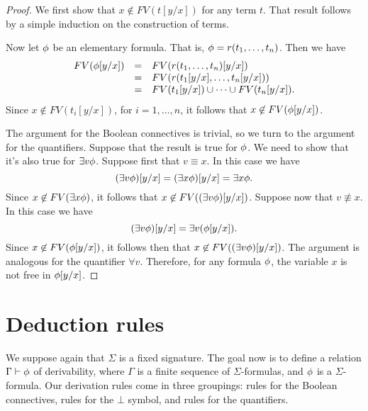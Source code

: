 \begin{proof} We first show that $x\not\in FV(t[y/x])$ for any term
  $t$.  That result follows by a simple induction on the construction
  of terms.

  Now let $\phi$ be an elementary formula.  That is,
  $\phi =r(t_1,\dots ,t_n)$.  Then we have
  \[ \begin{array}{l l l} FV(\phi [y/x]) & = & FV(r(t_1,\dots ,t_n)[y/x]) \\
                                        &=& FV(r(t_1[y/x],\dots ,t_n[y/x])) \\
                                        &=& FV(t_1[y/x])\cup\cdots\cup
                                            FV(t_n[y/x])
                                            .\end{array} \] %
                                        Since $x\not\in FV(t_i[y/x])$,
                                        for $i=1,\dots ,n$, it follows
                                        that $x\not\in FV(\phi [y/x])$.

The argument for the Boolean connectives is trivial, so we turn to the
argument for the quantifiers.  Suppose that the result is true for
$\phi$.  We need to show that it's also true for $\exists v\phi$.
Suppose first that $v\equiv x$.  In this case we have
\[ (\exists v\phi )[y/x] = (\exists x\phi )[y/x] = \exists x\phi .\]
Since $x\not\in FV(\exists x\phi )$, it follows that $x\not\in
FV((\exists v \phi )[y/x])$.  Suppose now that $v\not\equiv x$.  In
this case we have
\[ (\exists v\phi )[y/x] = \exists v(\phi [y/x]) .\] Since
$x\not\in FV(\phi [y/x])$, it follows then that
$x\not\in FV((\exists v\phi )[y/x])$. The argument is analogous for the
quantifier $\forall v$.  Therefore, for any formula $\phi$, the
variable $x$ is not free in $\phi [y/x]$.
\end{proof}











\section{Deduction rules}

We suppose again that $\Sigma$ is a fixed signature.  The goal now is
to define a relation $\Gamma \vdash \phi$ of derivability, where
$\Gamma$ is a finite sequence of $\Sigma$-formulas, and $\phi$ is a
$\Sigma$-formula.  Our derivation rules come in three groupings: rules
for the Boolean connectives, rules for the $\bot$ symbol, and rules
for the quantifiers.

